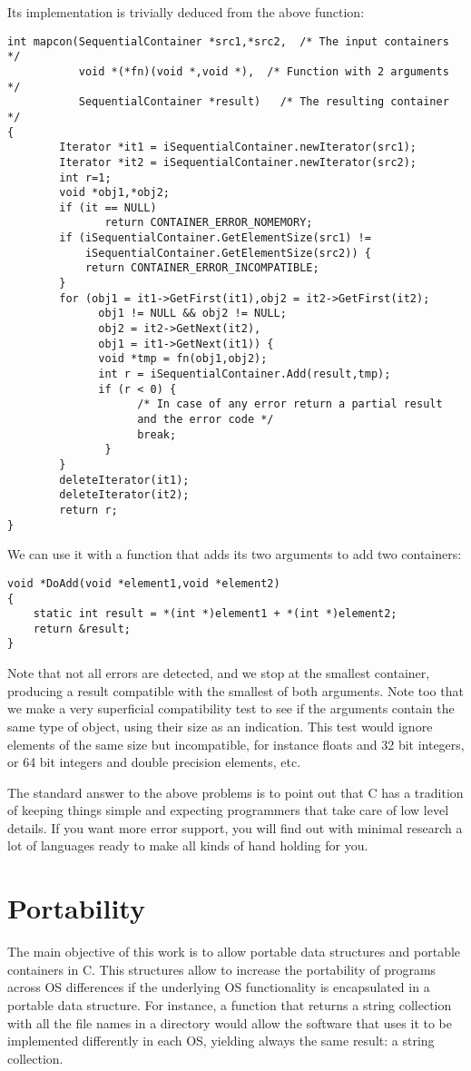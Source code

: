 \documentclass[12pt,a4paper]{memoir} %
\begin{document}
{{Its implementation is trivially deduced from the above function:
\begin{verbatim}
int mapcon(SequentialContainer *src1,*src2,  /* The input containers */
           void *(*fn)(void *,void *),  /* Function with 2 arguments */
           SequentialContainer *result)   /* The resulting container */
{
        Iterator *it1 = iSequentialContainer.newIterator(src1);
        Iterator *it2 = iSequentialContainer.newIterator(src2);
        int r=1;
        void *obj1,*obj2;
        if (it == NULL)
               return CONTAINER_ERROR_NOMEMORY;
        if (iSequentialContainer.GetElementSize(src1) != 
            iSequentialContainer.GetElementSize(src2)) {
            return CONTAINER_ERROR_INCOMPATIBLE;
        }
        for (obj1 = it1->GetFirst(it1),obj2 = it2->GetFirst(it2);
              obj1 != NULL && obj2 != NULL;
              obj2 = it2->GetNext(it2),
              obj1 = it1->GetNext(it1)) {
              void *tmp = fn(obj1,obj2);
              int r = iSequentialContainer.Add(result,tmp);
              if (r < 0) {
                    /* In case of any error return a partial result 
                    and the error code */
                    break;
               }
        }
        deleteIterator(it1);
        deleteIterator(it2);
        return r;
}
\end{verbatim}
We can use it with a function  that adds its two arguments to add two containers:
\begin{verbatim}
void *DoAdd(void *element1,void *element2)
{
    static int result = *(int *)element1 + *(int *)element2;
    return &result;
}
\end{verbatim}
Note that not all errors are detected, and we stop at the smallest container, producing a result compatible with the smallest of both arguments.
Note too that we make a very superficial compatibility test to see if the arguments contain the same type of object, using their size as an indication. This test would ignore elements of the same size but incompatible, for instance floats and 32 bit integers, or 64 bit integers and double precision elements, etc.

The standard answer to the above problems is to point out that C has a tradition of keeping things simple and expecting programmers that take care of low level details. If you want more error support, you will find out with minimal research a lot of languages ready to make all kinds of hand holding for you.
\section{Portability}
The main objective of this work is to allow portable data structures and portable containers in C. This structures allow to increase the portability of programs across OS differences if the underlying OS functionality is encapsulated in a portable data structure. For instance, a function that returns a string collection with all the file names in a directory would allow the software that uses it to be implemented differently in each OS, yielding always the same result: a string collection.

}}
\end{document}
